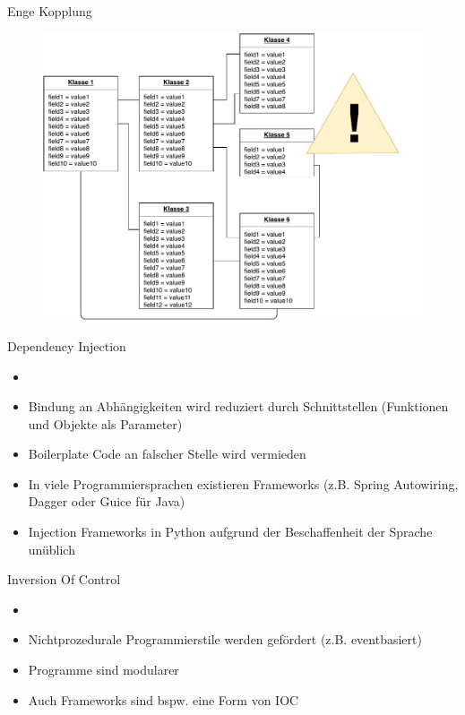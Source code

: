 \begin{frame}{Enge Kopplung}
    	  \begin{figure}[!htb]
        \includegraphics[scale=0.5]{07-python3/img/tightcoupling}
    \end{figure}
\end{frame}


\begin{frame}{Dependency Injection}
 \begin{itemize}
        \setlength{\itemindent}{1.3in}
        \item [\textbf{Dependency Injection}]
    \end{itemize}

    \begin{itemize}
        \item Bindung an Abhängigkeiten wird reduziert durch Schnittstellen (Funktionen und Objekte als Parameter)
        \item Boilerplate Code an falscher Stelle wird vermieden
        \item In viele Programmiersprachen existieren Frameworks (z.B. Spring Autowiring, Dagger oder Guice für Java)
        \item Injection Frameworks in Python aufgrund der Beschaffenheit der Sprache unüblich
   \end{itemize}

\end{frame}


\begin{frame}{Inversion Of Control}
\begin{itemize}
        \setlength{\itemindent}{1.25in}
        \item [\textbf{Inversion Of Control}]
    \end{itemize}

    \begin{itemize}
        \item Nichtprozedurale Programmierstile werden gefördert (z.B. eventbasiert)
        \item Programme sind modularer
        \item Auch Frameworks sind bspw. eine Form von IOC
   \end{itemize}

\end{frame}


